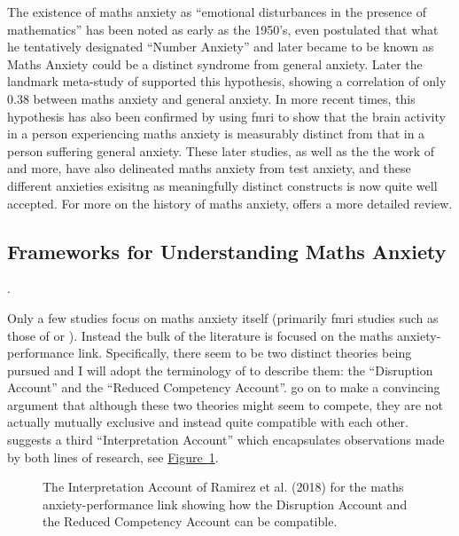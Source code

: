 \documentclass[twoside,12pt,a4paper]{report}
\newcommand{\reffig}[1]{\hyperref[fig:#1]{Figure~\ref{fig:#1}}}
\begin{document}
The existence of maths anxiety as ``emotional disturbances in the presence of mathematics'' has been noted as early as the 1950's,  even postulated that what he tentatively designated ``Number Anxiety'' and later became to be known as Maths Anxiety could be a distinct syndrome from general anxiety. Later the landmark meta-study of  supported this hypothesis, showing a correlation of only $0.38$ between maths anxiety and general anxiety. In more recent times, this hypothesis has also been confirmed by  using \gls{fmri} to show that the brain activity in a person experiencing maths anxiety is measurably distinct from that in a person suffering general anxiety. These later studies, as well as the the work of  and more, have also delineated maths anxiety from test anxiety, and these different anxieties exisitng as meaningfully distinct constructs is now quite well accepted. For more on the history of maths anxiety,  offers a more detailed review.


\subsection*{Frameworks for Understanding Maths Anxiety}.

Only a few studies focus on maths anxiety itself (primarily \gls{fmri} studies such as those of   or ). Instead the bulk of the literature is focused on the maths anxiety-performance link.  Specifically, there seem to be two distinct theories being pursued and I will adopt the terminology of  to describe them: the ``Disruption Account'' and the ``Reduced Competency Account''.  go on to make a convincing argument that although these two theories might seem to compete, they are not actually mutually exclusive and instead quite compatible with each other.  suggests a third ``Interpretation Account'' which encapsulates observations made by both lines of research, see \reffig{ramirez}.

\begin{figure}
\begin{center}

\caption{The Interpretation Account of Ramirez et al. (2018) for the maths anxiety-performance link showing how the Disruption Account and the Reduced Competency Account can be compatible.
\label{fig:ramirez}}
\end{center}
\end{figure}
\end{document}
